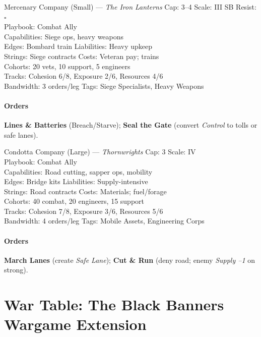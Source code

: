 \documentclass[11pt]{article}
\begin{document}
\begin{followerbox}{Mercenary Company (Small) --- \emph{The Iron Lanterns}}
Cap: 3--4 \quad Scale: III \quad SB Resist: \(\square\) \\
Playbook: Combat Ally \\
Capabilities: Siege ops, heavy weapons \\
Edges: Bombard train \quad Liabilities: Heavy upkeep \\
Strings: Siege contracts \quad Costs: Veteran pay; trains \\
Cohorts: 20 vets, 10 support, 5 engineers \\
Tracks: Cohesion 6/8, Exposure 2/6, Resources 4/6 \\
Bandwidth: 3 orders/leg \quad Tags: Siege Specialists, Heavy Weapons
\paragraph{Orders}
\textbf{Lines \& Batteries} (Breach/Starve); \textbf{Seal the Gate} (convert \emph{Control} to tolls or safe lanes).
\end{followerbox}

\begin{followerbox}{Condotta Company (Large) --- \emph{Thornwrights}}
Cap: 3 \quad Scale: IV \\
Playbook: Combat Ally \\
Capabilities: Road cutting, sapper ops, mobility \\
Edges: Bridge kits \quad Liabilities: Supply-intensive \\
Strings: Road contracts \quad Costs: Materials; fuel/forage \\
Cohorts: 40 combat, 20 engineers, 15 support \\
Tracks: Cohesion 7/8, Exposure 3/6, Resources 5/6 \\
Bandwidth: 4 orders/leg \quad Tags: Mobile Assets, Engineering Corps
\paragraph{Orders}
\textbf{March Lanes} (create \emph{Safe Lane}); \textbf{Cut \& Run} (deny road; enemy \emph{Supply --1} on strong).
\end{followerbox}

\section{War Table: The Black Banners Wargame Extension}
\end{document}
